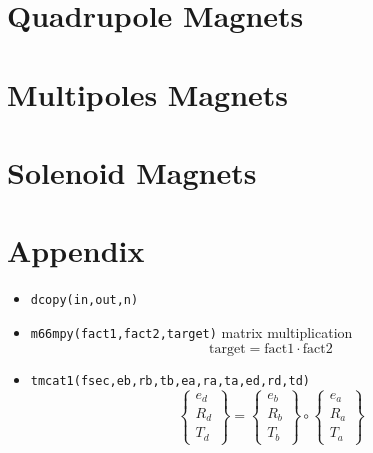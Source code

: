 \documentclass{cern-art} %
\renewcommand{\L}[1]{\lstinline[firstnumber=last]{#1}}
\begin{document}
\section{Quadrupole Magnets}

\section{Multipoles Magnets}

\section{Solenoid Magnets}

\appendix
\section{Appendix}
\begin{itemize}
\item[-] \L{dcopy(in,out,n)}
\item[-] \L{m66mpy(fact1,fact2,target)} matrix multiplication $$\text{target} = \text{fact1} \cdot \text{fact2}$$
\item[-] \L{tmcat1(fsec,eb,rb,tb,ea,ra,ta,ed,rd,td)}$$\left\{ \begin{array}{c}
e_{d}\\
R_{d}\\
T_{d}
\end{array}\right\} =\left\{ \begin{array}{c}
e_{b}\\
R_{b}\\
T_{b}
\end{array}\right\} \circ \left\{ \begin{array}{c}
e_{a}\\
R_{a}\\
T_{a}
\end{array}\right\} $$
\end{itemize}
\end{document}
